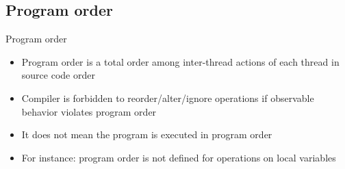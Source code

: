 \ifrender
\subsection{Program order}
\begin{frame}{Program order}
\begin{itemize}[<+->]
\item Program order is a total order among inter-thread actions of each thread in source code order
\item Compiler is forbidden to reorder/alter/ignore operations if observable behavior violates program order
\item It does not mean the program is executed in program order
\item For instance: program order is not defined for operations on local variables
\end{itemize}
\end{frame}
\fi
